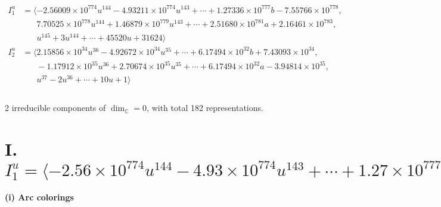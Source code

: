 \documentclass[1p]{elsarticle_modified}
\theoremstyle{definition}
\begin{document}
\begin{align*}
I^u_{1}&=\langle 
-2.56009\times10^{774} u^{144}-4.93211\times10^{774} u^{143}+\cdots+1.27336\times10^{777} b-7.55766\times10^{778},\\
\phantom{I^u_{1}}&\phantom{= \langle  }7.70525\times10^{778} u^{144}+1.46879\times10^{779} u^{143}+\cdots+2.51680\times10^{781} a+2.16461\times10^{783},\\
\phantom{I^u_{1}}&\phantom{= \langle  }u^{145}+3 u^{144}+\cdots+45520 u+31624\rangle \\
I^u_{2}&=\langle 
2.15856\times10^{34} u^{36}-4.92672\times10^{34} u^{35}+\cdots+6.17494\times10^{32} b+7.43093\times10^{34},\\
\phantom{I^u_{2}}&\phantom{= \langle  }-1.17912\times10^{35} u^{36}+2.70674\times10^{35} u^{35}+\cdots+6.17494\times10^{32} a-3.94814\times10^{35},\\
\phantom{I^u_{2}}&\phantom{= \langle  }u^{37}-2 u^{36}+\cdots+10 u+1\rangle \\
\\
\end{align*}
\raggedright * 2 irreducible components of $\dim_{\mathbb{C}}=0$, with total 182 representations.\\
\newpage
\renewcommand{\arraystretch}{1}
\centering \section*{I. $I^u_{1}= \langle -2.56\times10^{774} u^{144}-4.93\times10^{774} u^{143}+\cdots+1.27\times10^{777} b-7.56\times10^{778},\;7.71\times10^{778} u^{144}+1.47\times10^{779} u^{143}+\cdots+2.52\times10^{781} a+2.16\times10^{783},\;u^{145}+3 u^{144}+\cdots+45520 u+31624 \rangle$}
\flushleft \textbf{(i) Arc colorings}\\
\end{document}
